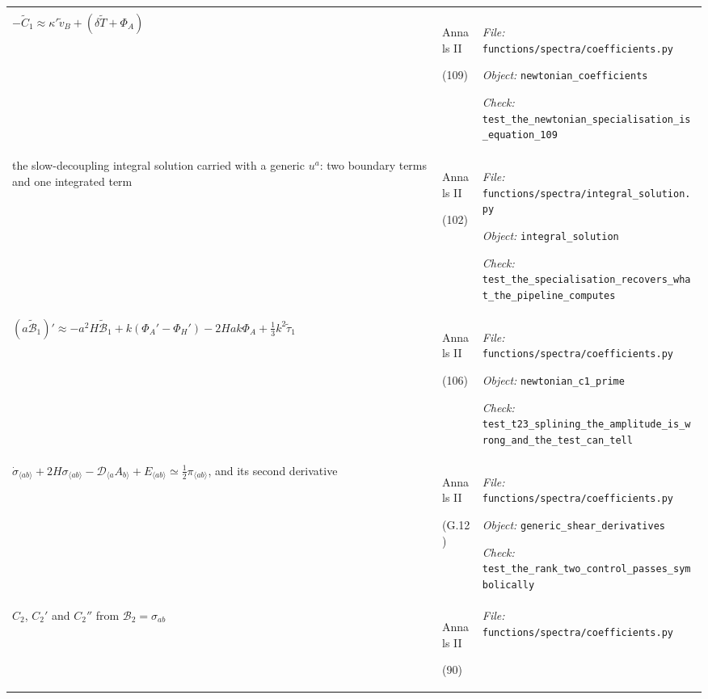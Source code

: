 \begin{landscape}
\begin{longtable}{@{}>{\raggedright\arraybackslash}p{80mm}
                     >{\raggedright\arraybackslash}p{38mm}
                     >{\raggedright\arraybackslash}p{99mm}@{}}
{\textit{Object:} \nolinkurl{c0_from_printed_89}\par
\textit{Check:} \nolinkurl{test_b11_is_a_sign_in_89_not_in_90}} \\
\addlinespace[2pt]
$-\tilde C_1 \approx \kappa'\tilde v_B + (\delta\tilde T + \Phi_A)$ & Annals II\par (109) & {\scriptsize \textit{File:} \nolinkurl{functions/spectra/coefficients.py}\par
\textit{Object:} \nolinkurl{newtonian_coefficients}\par
\textit{Check:} \nolinkurl{test_the_newtonian_specialisation_is_equation_109}} \\
\addlinespace[2pt]
the slow-decoupling integral solution carried with a generic $u^a$: two boundary terms and one integrated term & Annals II\par (102) & {\scriptsize \textit{File:} \nolinkurl{functions/spectra/integral_solution.py}\par
\textit{Object:} \nolinkurl{integral_solution}\par
\textit{Check:} \nolinkurl{test_the_specialisation_recovers_what_the_pipeline_computes}} \\
\addlinespace[2pt]
$(a\tilde{\mathcal{B}}_1)' \approx -a^2H\tilde{\mathcal{B}}_1 + k(\Phi_A'-\Phi_H') - 2Hak\Phi_A + \tfrac13k^2\tilde\tau_1$ & Annals II\par (106) & {\scriptsize \textit{File:} \nolinkurl{functions/spectra/coefficients.py}\par
\textit{Object:} \nolinkurl{newtonian_c1_prime}\par
\textit{Check:} \nolinkurl{test_t23_splining_the_amplitude_is_wrong_and_the_test_can_tell}} \\
\addlinespace[2pt]
$\dot\sigma_{\langle ab\rangle}+2H\sigma_{\langle ab\rangle}-\mathcal{D}_{\langle a}A_{b\rangle}+E_{\langle ab\rangle}\simeq\tfrac12\pi_{\langle ab\rangle}$, and its second derivative & Annals II\par (G.12) & {\scriptsize \textit{File:} \nolinkurl{functions/spectra/coefficients.py}\par
\textit{Object:} \nolinkurl{generic_shear_derivatives}\par
\textit{Check:} \nolinkurl{test_the_rank_two_control_passes_symbolically}} \\
\addlinespace[2pt]
$C_2$, $C_2'$ and $C_2''$ from $\mathcal{B}_2=\sigma_{ab}$ & Annals II\par (90) & {\scriptsize \textit{File:} \nolinkurl{functions/spectra/coefficients.py}\par
}
\end{longtable}
\end{landscape}
